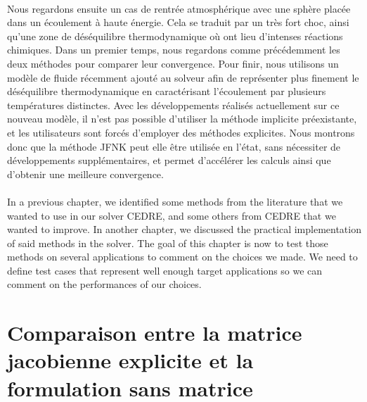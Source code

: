 \begin{tcolorbox}[title=Résumé du chapitre : Analyse de la méthode JFNK dans CEDRE, colframe=black!50!white]
  \paragraph{}
  Nous regardons ensuite un cas de rentrée atmosphérique avec une sphère placée dans un écoulement à haute énergie.
  Cela se traduit par un très fort choc, ainsi qu'une zone de déséquilibre thermodynamique où ont lieu d'intenses réactions chimiques.
  Dans un premier temps, nous regardons comme précédemment les deux méthodes pour comparer leur convergence.
  Pour finir, nous utilisons un modèle de fluide récemment ajouté au solveur afin de représenter plus finement le déséquilibre thermodynamique en caractérisant l'écoulement par plusieurs températures distinctes.
  Avec les développements réalisés actuellement sur ce nouveau modèle, il n'est pas possible d'utiliser la méthode implicite préexistante, et les utilisateurs sont forcés d'employer des méthodes explicites.
  Nous montrons donc que la méthode JFNK peut elle être utilisée en l'état, sans nécessiter de développements supplémentaires, et permet d'accélérer les calculs ainsi que d'obtenir une meilleure convergence.
\end{tcolorbox}


  \paragraph{}
  In a previous chapter, we identified some methods from the literature that we wanted to use in our solver CEDRE, and some others from CEDRE that we wanted to improve.
  In another chapter, we discussed the practical implementation of said methods in the solver.
  The goal of this chapter is now to test those methods on several applications to comment on the choices we made.
  We need to define test cases that represent well enough target applications so we can comment on the performances of our choices.


  \section{Comparaison entre la matrice jacobienne explicite et la formulation sans matrice}

